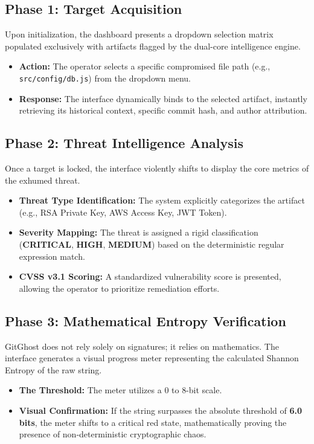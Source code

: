 \documentclass[12pt, a4paper, oneside]{report}
\begin{document}
\subsection{Phase 1: Target Acquisition}
Upon initialization, the dashboard presents a dropdown selection matrix populated exclusively with artifacts flagged by the dual-core intelligence engine.
\begin{itemize}
    \item \textbf{Action:} The operator selects a specific compromised file path (e.g., \texttt{src/config/db.js}) from the dropdown menu.
    \item \textbf{Response:} The interface dynamically binds to the selected artifact, instantly retrieving its historical context, specific commit hash, and author attribution.
\end{itemize}

\subsection{Phase 2: Threat Intelligence Analysis}
Once a target is locked, the interface violently shifts to display the core metrics of the exhumed threat.
\begin{itemize}
    \item \textbf{Threat Type Identification:} The system explicitly categorizes the artifact (e.g., RSA Private Key, AWS Access Key, JWT Token).
    \item \textbf{Severity Mapping:} The threat is assigned a rigid classification (\textbf{CRITICAL}, \textbf{HIGH}, \textbf{MEDIUM}) based on the deterministic regular expression match.
    \item \textbf{CVSS v3.1 Scoring:} A standardized vulnerability score is presented, allowing the operator to prioritize remediation efforts.
\end{itemize}

\subsection{Phase 3: Mathematical Entropy Verification}
GitGhost does not rely solely on signatures; it relies on mathematics. The interface generates a visual progress meter representing the calculated Shannon Entropy of the raw string.
\begin{itemize}
    \item \textbf{The Threshold:} The meter utilizes a 0 to 8-bit scale. 
    \item \textbf{Visual Confirmation:} If the string surpasses the absolute threshold of \textbf{6.0 bits}, the meter shifts to a critical red state, mathematically proving the presence of non-deterministic cryptographic chaos.
\end{itemize}
\end{document}
